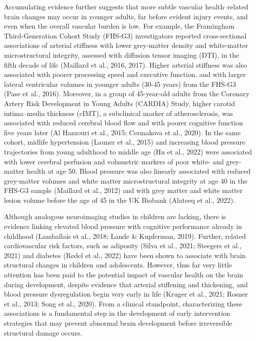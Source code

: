 \documentclass[
  letterpaper,
  DIV=11,
  numbers=noendperiod]{scrreport}
\begin{document}
Accumulating evidence further suggests that more subtle vascular
health--related brain changes may occur in younger adults, far before
evident injury events, and even when the overall vascular burden is low.
For example, the Framingham Third-Generation Cohort Study (FHS-G3)
investigators reported cross-sectional associations of arterial
stiffness with lower grey-matter density and white-matter
microstructural integrity, assessed with diffusion tensor imaging (DTI),
in the fifth decade of life (Maillard et al., 2016, 2017). Higher
arterial stiffness was also associated with poorer processing speed and
executive function, and with larger lateral ventricular volumes in
younger adults (30-45 years) from the FHS-G3 (Pase et al., 2016).
Moreover, in a group of 45-year-old adults from the Coronary Artery Risk
Development in Young Adults (CARDIA) Study, higher carotid intima--media
thickness (cIMT), a subclinical marker of atherosclerosis, was
associated with reduced cerebral blood flow and with poorer cognitive
function five years later (Al Hazzouri et al., 2015; Cermakova et al.,
2020). In the same cohort, midlife hypertension (Launer et al., 2015)
and increasing blood pressure trajectories from young adulthood to
middle age (Hu et al., 2022) were associated with lower cerebral
perfusion and volumetric markers of poor white- and grey- matter health
at age 50. Blood pressure was also linearly associated with reduced
grey-matter volumes and white matter microstructural integrity at age 40
in the FHS-G3 sample (Maillard et al., 2012) and with grey matter and
white matter lesion volume before the age of 45 in the UK Biobank
(Alateeq et al., 2022).

Although analogous neuroimaging studies in children are lacking, there
is evidence linking elevated blood pressure with cognitive performance
already in childhood (Lamballais et al., 2018; Lande \& Kupferman,
2019). Further, related cardiovascular risk factors, such as adiposity
(Silva et al., 2021; Steegers et al., 2021) and diabetes (Redel et al.,
2022) have been shown to associate with brain structural changes in
children and adolescents. However, thus far very little attention has
been paid to the potential impact of vascular health on the brain during
development, despite evidence that arterial stiffening and thickening,
and blood pressure dysregulation begin very early in life (Kruger et
al., 2021; Rosner et al., 2013; Song et al., 2020). From a clinical
standpoint, characterizing these associations is a fundamental step in
the development of early intervention strategies that may prevent
abnormal brain development before irreversible structural damage occurs.
\end{document}
